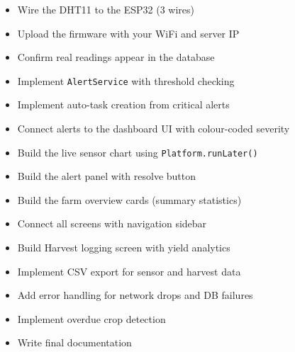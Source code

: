 \documentclass[12pt, a4paper]{report}
\begin{document}
\begin{tcolorbox}[infobox, title={Stage 4 --- ESP32 Integration (Day 4)}]
\begin{itemize}[noitemsep]
    \item Wire the DHT11 to the ESP32 (3 wires)
    \item Upload the firmware with your WiFi and server IP
    \item Confirm real readings appear in the database
\end{itemize}
\end{tcolorbox}

\begin{tcolorbox}[notebox, title={Stage 5 --- Alert System \& Auto-Tasks (Day 5)}]
\begin{itemize}[noitemsep]
    \item Implement \texttt{AlertService} with threshold checking
    \item Implement auto-task creation from critical alerts
    \item Connect alerts to the dashboard UI with colour-coded severity
\end{itemize}
\end{tcolorbox}

\begin{tcolorbox}[notebox, title={Stage 6 --- Full Dashboard (Day 6)}]
\begin{itemize}[noitemsep]
    \item Build the live sensor chart using \texttt{Platform.runLater()}
    \item Build the alert panel with resolve button
    \item Build the farm overview cards (summary statistics)
    \item Connect all screens with navigation sidebar
\end{itemize}
\end{tcolorbox}

\begin{tcolorbox}[notebox, title={Stage 7 --- Harvest, Export \& Polish (Day 7)}]
\begin{itemize}[noitemsep]
    \item Build Harvest logging screen with yield analytics
    \item Implement CSV export for sensor and harvest data
    \item Add error handling for network drops and DB failures
    \item Implement overdue crop detection
    \item Write final documentation
\end{itemize}
\end{tcolorbox}
\end{document}
